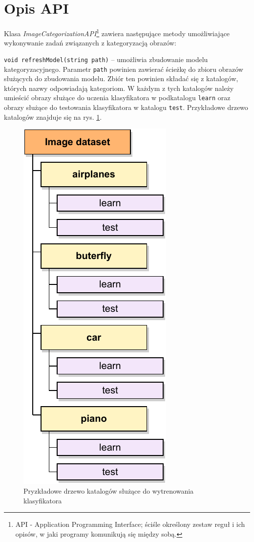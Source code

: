 \section{Opis API}

Klasa \emph{ImageCategorizationAPI}\footnote{API - Application Programming Interface; ściśle określony zestaw reguł i ich opisów, w jaki programy komunikują się między sobą.} zawiera następujące metody umożliwiające wykonywanie zadań związanych z kategoryzacją obrazów:

\begin{compactitem}
	\item \texttt{void refreshModel(string path)} -- umożliwia zbudowanie modelu kategoryzacyjnego. Parametr \texttt{path} powinien zawierać ścieżkę do zbioru obrazów służących do zbudowania modelu. Zbiór ten powinien składać się z katalogów, których nazwy odpowiadają kategoriom. W każdym z tych katalogów należy umieścić obrazy służące do uczenia klasyfikatora w podkatalogu \texttt{learn} oraz obrazy służące do testowania klasyfikatora w katalogu \texttt{test}. Przykładowe drzewo katalogów znajduje się na rys. \ref{fig:api-directory-tree}.
	
	\begin{figure}[h]
		\centering
		\includegraphics[scale=1.0]{graphics/03_implementacja/api-directory-tree.pdf}
		\caption{ Pryzkładowe drzewo katalogów służące do wytrenowania klasyfikatora }
		\label{fig:api-directory-tree}
	\end{figure}
	

\end{compactitem}
